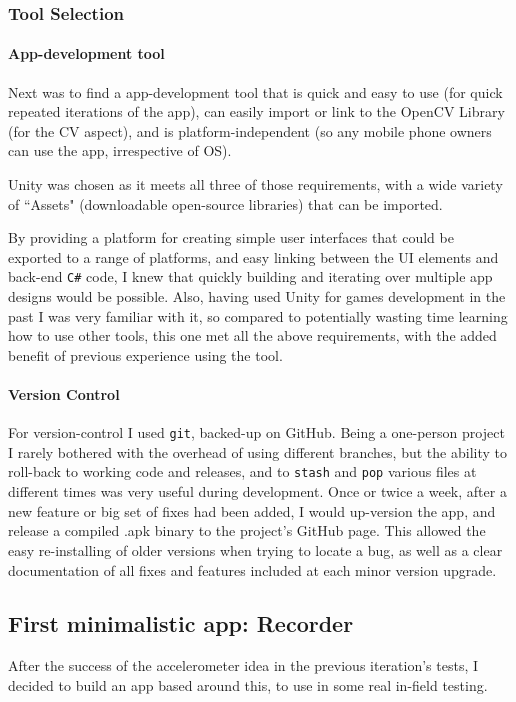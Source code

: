 \subsubsection{Tool Selection}
\paragraph{App-development tool}
Next was to find a app-development tool that is quick and easy to use (for quick repeated iterations of the app), can easily import or link to the OpenCV Library (for the CV aspect), and is platform-independent (so any mobile phone owners can use the app, irrespective of OS).

Unity was chosen as it meets all three of those requirements, with a wide variety of ``Assets" (downloadable open-source libraries) that can be imported.
 
By providing a platform for creating simple user interfaces that could be exported to a range of platforms, and easy linking between the UI elements and back-end \verb|C#| code, I knew that quickly building and iterating over multiple app designs would be possible.
Also, having used Unity for games development in the past I was very familiar with it, so compared to potentially wasting time learning how to use other tools, this one met all the above requirements, with the added benefit of previous experience using the tool.

\paragraph{Version Control}
For version-control I used \verb|git|, backed-up on GitHub.
Being a one-person project I rarely bothered with the overhead of using different branches, but the ability to roll-back to working code and releases, and to \verb|stash| and \verb|pop| various files at different times was very useful during development.
Once or twice a week, after a new feature or big set of fixes had been added, I would up-version the app, and release a compiled .apk binary to the project's GitHub page.
This allowed the easy re-installing of older versions when trying to locate a bug, as well as a clear documentation of all fixes and features included at each minor version upgrade.




\subsection{First minimalistic app: Recorder}
After the success of the accelerometer idea in the previous iteration's tests, I decided to build an app based around this, to use in some real in-field testing.

